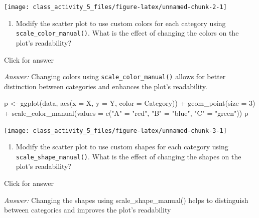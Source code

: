 \documentclass[
]{book}
\newenvironment{Shaded}{\begin{snugshade}}{\end{snugshade}}
\newcommand{\AttributeTok}[1]{\textcolor[rgb]{0.77,0.63,0.00}{#1}}
\newcommand{\DecValTok}[1]{\textcolor[rgb]{0.00,0.00,0.81}{#1}}
\newcommand{\FunctionTok}[1]{\textcolor[rgb]{0.00,0.00,0.00}{#1}}
\newcommand{\NormalTok}[1]{#1}
\newcommand{\OtherTok}[1]{\textcolor[rgb]{0.56,0.35,0.01}{#1}}
\newcommand{\SpecialCharTok}[1]{\textcolor[rgb]{0.00,0.00,0.00}{#1}}
\newcommand{\StringTok}[1]{\textcolor[rgb]{0.31,0.60,0.02}{#1}}
\providecommand{\tightlist}{%
  \setlength{\itemsep}{0pt}\setlength{\parskip}{0pt}}
\begin{document}
\texttt{[image: class\_activity\_5\_files/figure-latex/unnamed-chunk-2-1]}

\begin{enumerate}
\def\labelenumi{\alph{enumi}.}
\tightlist
\item
  Modify the scatter plot to use custom colors for each category using \texttt{scale\_color\_manual()}. What is the effect of changing the colors on the plot's readability?
\end{enumerate}

Click for answer

\emph{Answer:} Changing colors using \texttt{scale\_color\_manual()} allows for better distinction between categories and enhances the plot's readability.

\begin{Shaded}
\begin{Highlighting}[]
\NormalTok{p }\OtherTok{\textless{}{-}} \FunctionTok{ggplot}\NormalTok{(data, }\FunctionTok{aes}\NormalTok{(}\AttributeTok{x =}\NormalTok{ X, }\AttributeTok{y =}\NormalTok{ Y, }\AttributeTok{color =}\NormalTok{ Category)) }\SpecialCharTok{+}
  \FunctionTok{geom\_point}\NormalTok{(}\AttributeTok{size =} \DecValTok{3}\NormalTok{) }\SpecialCharTok{+}
  \FunctionTok{scale\_color\_manual}\NormalTok{(}\AttributeTok{values =} \FunctionTok{c}\NormalTok{(}\StringTok{"A"} \OtherTok{=} \StringTok{"red"}\NormalTok{, }\StringTok{"B"} \OtherTok{=} \StringTok{"blue"}\NormalTok{, }\StringTok{"C"} \OtherTok{=} \StringTok{"green"}\NormalTok{))}
\NormalTok{p}
\end{Highlighting}
\end{Shaded}

\texttt{[image: class\_activity\_5\_files/figure-latex/unnamed-chunk-3-1]}

\begin{enumerate}
\def\labelenumi{\alph{enumi}.}
\setcounter{enumi}{1}
\tightlist
\item
  Modify the scatter plot to use custom shapes for each category using \texttt{scale\_shape\_manual()}. What is the effect of changing the shapes on the plot's readability?
\end{enumerate}

Click for answer

\emph{Answer:} Changing the shapes using scale\_shape\_manual() helps to distinguish between categories and improves the plot's readability
\end{document}
